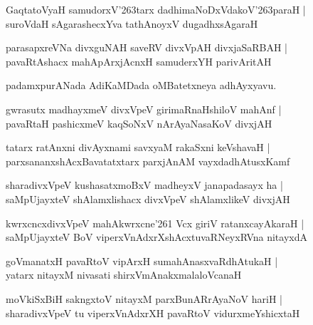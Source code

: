 \documentclass[twoside,12pt,openright]{book}
\def\S{\char'263}
\newcounter{shloka}[chapter]
\begin{document}
\begin{shloka}
GaqtatoVyaH samudorxV\S tarx dadhimaNoDxVdakoV\S paraH |\\
suroVdaH sAgarashecxYva tathAnoyxV dugadhxsAgaraH 
\end{shloka}

\begin{shloka}
parasapxreVNa divxguNAH saveRV divxVpAH divxjaSaRBAH |\\
pavaRtAshacx mahApArxjAcnxH  samuderxYH parivAritAH
\end{shloka}

\begin{center}
padamxpurANada AdiKaMDada oMBatetxneya adhAyxyavu.
\end{center}

\begin{shloka}
gwrasutx madhayxmeV divxVpeV girimaRnaHshiloV mahAnf |\\
pavaRtaH pashicxmeV kaqSoNxV nArAyaNasaKoV divxjAH 
\end{shloka}

\begin{shloka}
tatarx ratAnxni divAyxnami savxyaM rakaSxni keVshavaH |\\
parxsananxshAcxBavatatxtarx parxjAnAM vayxdadhAtusxKamf
\end{shloka}

\begin{shloka}
sharadivxVpeV kushasatxmoBxV madheyxV janapadasayx ha |\\
saMpUjayxteV shAlamxlishacx divxVpeV shAlamxlikeV divxjAH
\end{shloka}

\begin{shloka}
kwrxcncxdivxVpeV mahAkwrxcne\char'261 Vcx giriV ratanxcayAkaraH |\\
saMpUjayxteV BoV viperxVnAdxrXshAcxtuvaRNeyxRVna nitayxdA
\end{shloka}

\begin{shloka}
goVmanatxH pavaRtoV vipArxH sumahAnasxvaRdhAtukaH |\\
yatarx nitayxM nivasati shirxVmAnakxmalaloVcanaH 
\end{shloka}

\begin{shloka}
moVkiSxBiH sakngxtoV nitayxM parxBunARrAyaNoV hariH |\\
sharadivxVpeV tu viperxVnAdxrXH pavaRtoV vidurxmeYshicxtaH
\end{shloka}
\end{document}
